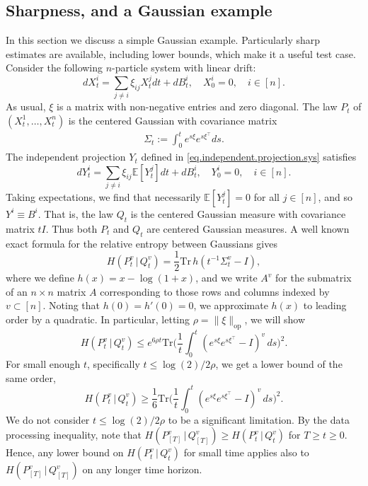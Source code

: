 \documentclass[11pt,reqno]{amsart}
\numberwithin{equation}{section}
\theoremstyle{definition}
\def\E{{\mathbb E}}
\def\tr{{\mathrm{Tr}}}
\begin{document}
\subsection{Sharpness, and a Gaussian example} \label{se:gaussian}
In this section we discuss a simple Gaussian example. Particularly sharp estimates are available, including lower bounds, which make it a useful test case.
Consider the following $n$-particle system with linear drift:
\begin{equation}
	d X^{i}_t = \sum_{j \neq i} \xi_{ij} X^{j}_t  dt + dB^i_t, \quad X^i_0 = 0, \quad i \in [n]. \label{def:SDEgaussian}
\end{equation}
As usual, $\xi$ is a matrix with non-negative entries and zero diagonal. 
The law $ P_t $ of $(X^1_t,\ldots,X^n_t)$ is the centered Gaussian with covariance  matrix
\begin{align*}
	\Sigma_t := \int_0^t e^{ s \xi} e^{s\xi^\top}ds.
\end{align*}
The independent projection $Y_t$ defined in \eqref{eq.independent.projection.sys} satisfies
\begin{equation}
	d Y^{i}_t = \sum_{j \neq i} \xi_{ij} \E[Y^j_t]dt + dB^i_t, \quad Y^i_0 = 0, \quad i \in [n]. \label{def:SDEgaussian-indproj}
\end{equation}
Taking expectations, we find that necessarily $\E[Y^j_t]=0$ for all $j \in [n]$, and so $Y^i \equiv B^i$.
That is, the law $Q_t$ is the centered Gaussian measure with covariance matrix $tI$. Thus both $P_t$ and $Q_t$ are  centered Gaussian measures. 
A well known exact formula for the relative entropy between Gaussians gives
\begin{equation*}
H(P^v_t\,|\,Q^v_t) = \frac12 \tr \, h(t^{-1}\Sigma^v_t-I),
\end{equation*}
where we define $h(x)=x-\log(1+x)$, and we write $A^v$ for the submatrix of an $n \times n$ matrix $A$ corresponding to those rows and columns indexed by $v \subset [n]$. Noting that $h(0)=h'(0)=0$, we approximate $h(x)$ to leading order by a quadratic. In particular, letting $\rho=\|\xi\|_{\mathrm{op}}$, we will show
\begin{equation}
H(P^v_t\,|\,Q^v_t) \le  e^{6 \rho t}\tr\bigg( \frac{1}{t} \int_0^t (e^{ s \xi} e^{s\xi^\top} - I)^v\,ds \bigg)^2. \label{ineq:Gaussianupper}
\end{equation}
For small enough $t$, specifically $t \le \log(2)/2\rho$, we get a lower bound of the same order,
\begin{equation*}
H(P^v_t\,|\,Q^v_t) \ge \frac16\tr\bigg( \frac{1}{t} \int_0^t (e^{ s \xi} e^{s\xi^\top} - I)^v\,ds \bigg)^2.
\end{equation*}
We do not consider $t \le \log(2)/2\rho$ to be a significant limitation. By the data processing inequality, note that $H(P^v_{[T]}\,|\,Q^v_{[T]}) \ge H(P^v_t\,|\,Q^v_t)$ for $T \ge t \ge 0$. Hence, any lower bound on $H(P^v_t\,|\,Q^v_t)$ for small time applies also to $H(P^v_{[T]}\,|\,Q^v_{[T]})$ on any longer time horizon.
\end{document}
